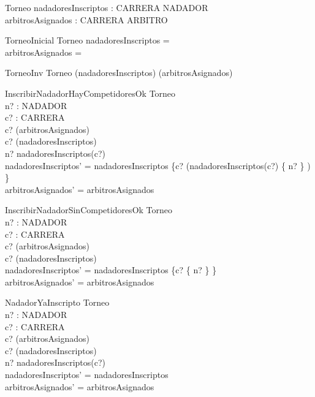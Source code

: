 \begin{zed}
\end{zed}

\begin{schema}{Torneo}
nadadoresInscriptos : CARRERA \pfun \power NADADOR \\
arbitrosAsignados : CARRERA \pfun \power ARBITRO
\end{schema}

\begin{schema}{TorneoInicial}
Torneo
\where
nadadoresInscriptos = \emptyset \\
arbitrosAsignados = \emptyset
\end{schema}

\begin{schema}{TorneoInv}
Torneo
\where
\dom(nadadoresInscriptos) \subseteq \dom(arbitrosAsignados)
\end{schema}

\begin{schema}{InscribirNadadorHayCompetidoresOk}
\Delta Torneo \\
n? : NADADOR \\
c? : CARRERA \\
\where
c? \in \dom(arbitrosAsignados) \\
c? \in \dom(nadadoresInscriptos) \\
n? \notin nadadoresInscriptos(c?) \\
nadadoresInscriptos' = nadadoresInscriptos \oplus \{c? \mapsto (nadadoresInscriptos(c?) \cup \{ n? \} ) \} \\
arbitrosAsignados' = arbitrosAsignados
\end{schema}

\begin{schema}{InscribirNadadorSinCompetidoresOk}
\Delta Torneo \\
n? : NADADOR \\
c? : CARRERA \\
\where
c? \in \dom(arbitrosAsignados) \\
c? \notin \dom(nadadoresInscriptos) \\
nadadoresInscriptos' = nadadoresInscriptos \cup \{c? \mapsto  \{ n? \} \} \\
arbitrosAsignados' = arbitrosAsignados
\end{schema}

\begin{schema}{NadadorYaInscripto}
\Xi Torneo \\
n? : NADADOR \\
c? : CARRERA \\
\where
c? \in \dom(arbitrosAsignados) \\
c? \in \dom(nadadoresInscriptos) \\
n? \in nadadoresInscriptos(c?) \\
nadadoresInscriptos' = nadadoresInscriptos \\
arbitrosAsignados' = arbitrosAsignados
\end{schema}

